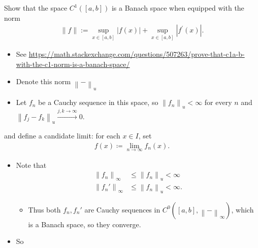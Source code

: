 Show that the space \(C^1([a, b])\) is a Banach space when equipped with
the norm
\begin{align*}
\|f\|:=\sup _{x \in[a, b]}|f(x)|+\sup _{x \in[a, b]}\left|f^{\prime}(x)\right|.
\end{align*}


\begin{solution}

\hfill

\begin{concept}

\hfill

\begin{itemize}
\tightlist
\item
  See
  \url{https://math.stackexchange.com/questions/507263/prove-that-c1a-b-with-the-c1-norm-is-a-banach-space/}
\end{itemize}

\end{concept}

\begin{itemize}
\item
  Denote this norm \({\left\lVert {{-}} \right\rVert}_u\)
\item
  Let \(f_n\) be a Cauchy sequence in this space, so
  \({\left\lVert {f_n} \right\rVert}_u < \infty\) for every \(n\) and
  \({\left\lVert {f_j - f_k} \right\rVert}_u \overset{j, k\to\infty}\to 0\).
\end{itemize}

and define a candidate limit: for each \(x\in I\), set
\begin{align*}f(x) \coloneqq\lim_{n\to\infty} f_n(x).\end{align*}

\begin{itemize}
\item
  Note that
  \begin{align*} 
  {\left\lVert {f_n} \right\rVert}_\infty &\leq {\left\lVert {f_n} \right\rVert}_u < \infty \\
  {\left\lVert {f_n'} \right\rVert}_\infty &\leq {\left\lVert {f_n} \right\rVert}_u < \infty
  .\end{align*}

  \begin{itemize}
  \tightlist
  \item
    Thus both \(f_n, f_n'\) are Cauchy sequences in
    \(C^0([a, b], {\left\lVert {{-}} \right\rVert}_\infty)\), which is a
    Banach space, so they converge.
  \end{itemize}
\item
  So


\end{itemize}
\end{solution}
